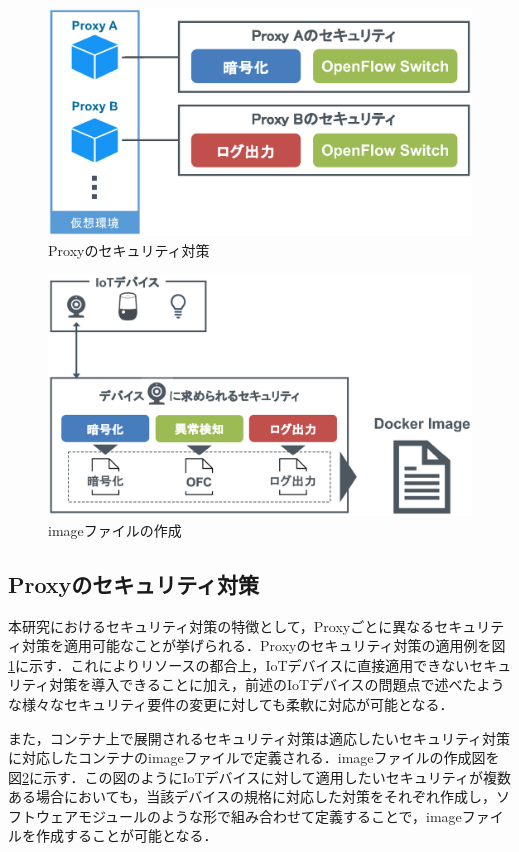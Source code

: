 \documentclass[Japanese]{dicomopapers}
\begin{document}
\begin{figure}[!tb]
	\centering
	\includegraphics[width=\linewidth]{img/security.eps}
	\caption{Proxyのセキュリティ対策}
	\label{fig:security}
\end{figure}

\begin{figure}[!tb]
	\centering
	\includegraphics[width=\linewidth]{img/dockerimage.eps}
	\caption{imageファイルの作成}
	\label{fig:dockerimage}
\end{figure}

\subsection{Proxyのセキュリティ対策}
本研究におけるセキュリティ対策の特徴として，Proxyごとに異なるセキュリティ対策を適用可能なことが挙げられる．Proxyのセキュリティ対策の適用例を図\ref{fig:security}に示す．これによりリソースの都合上，IoTデバイスに直接適用できないセキュリティ対策を導入できることに加え，前述のIoTデバイスの問題点で述べたような様々なセキュリティ要件の変更に対しても柔軟に対応が可能となる．\par
また，コンテナ上で展開されるセキュリティ対策は適応したいセキュリティ対策に対応したコンテナのimageファイルで定義される．imageファイルの作成図を図\ref{fig:dockerimage}に示す．この図のようにIoTデバイスに対して適用したいセキュリティが複数ある場合においても，当該デバイスの規格に対応した対策をそれぞれ作成し，ソフトウェアモジュールのような形で組み合わせて定義することで，imageファイルを作成することが可能となる．
\end{document}
